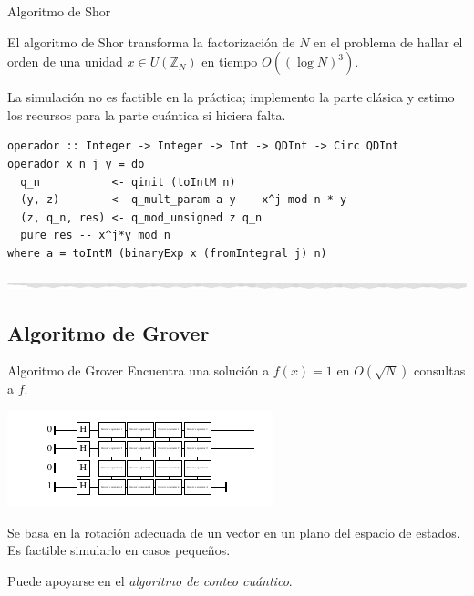 \documentclass[ignorenonframetext,aspectratio=43,]{beamer}
\newcommand{\ZZ}{\mathbb{Z}}
\begin{document}
\begin{frame}[fragile]{Algoritmo de Shor}

  El algoritmo de Shor transforma la factorización de $N$ en el problema de
  hallar el orden de una unidad $x \in U(\ZZ_N)$ en tiempo $O((\log N)^3)$.

  La simulación no es factible en la práctica; implemento la parte clásica y estimo los recursos para la parte
  cuántica si hiciera falta.

  \begin{lstlisting}
operador :: Integer -> Integer -> Int -> QDInt -> Circ QDInt
operador x n j y = do
  q_n           <- qinit (toIntM n)
  (y, z)        <- q_mult_param a y -- x^j mod n * y
  (z, q_n, res) <- q_mod_unsigned z q_n
  pure res -- x^j*y mod n
where a = toIntM (binaryExp x (fromIntegral j) n)
  \end{lstlisting}
  \includegraphics[width=\textwidth]{img/shor}
\end{frame}

\subsection{Algoritmo de Grover}

\begin{frame}[fragile]{Algoritmo de Grover}
  Encuentra una solución a $f(x) = 1$ en $O\left(\sqrt{N}\right)$ consultas a $f$.

  \includegraphics[width=\textwidth]{img/grover}

  Se basa en la rotación adecuada de un vector en un plano del espacio de estados.
  Es factible simularlo en casos pequeños.

  Puede apoyarse en el \emph{algoritmo de conteo cuántico}.

\end{frame}
\end{document}
